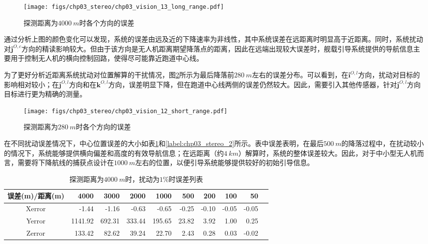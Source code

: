 \begin{figure}[htb]
\centering
\texttt{[image: figs/chp03\_stereo/chp03\_vision\_13\_long\_range.pdf]}	
\caption{探测距离为$4000\ m$时各个方向的误差}
\label{fig:chp03_vision_13_long_range}
\end{figure}
通过分析上图的颜色变化可以发现，系统的误差由远及近的下降速率为非线性，其中系统误差在远距离时明显高于近距离。同时，系统扰动对$\mathbf{j}^{O,c}$方向的精读影响较大。但由于该方向是无人机距离期望降落点的距离，因此在远端出现较大误差时，舰载引导系统提供的导航信息主要用于控制无人机的横向控制回路，使得尽可能靠近跑道中心线。

为了更好分析近距离系统扰动对位置解算的干扰情况，图\ref{fig:chp03_vision_12_short_range}所示为最后降落前$280\ m$左右的误差分布。可以看到，在$\mathbf{i}^{O,l}$方向，扰动对目标的影响相对较小；在$\mathbf{j}^{O,l}$方向和在$\mathbf{k}^{O,l}$方向，误差明显下降，但在跑道中心线两侧的误差仍然较大。因此，需要引入其他传感器，针对$\mathbf{j}^{O,l}$方向目标进行更为精确的测量。

\begin{figure}[htb]
	\centering
	\texttt{[image: figs/chp03\_stereo/chp03\_vision\_12\_short\_range.pdf]}	
	\caption{探测距离为$280\ m$时各个方向的误差}
	\label{fig:chp03_vision_12_short_range}
\end{figure}


在不同扰动误差情况下，中心位置误差的大小如表\ref{label:chp03_stereo_1}和\ref{label:chp03_stereo_2}所示。表中误差表明，在最后$500\ m$的降落过程中，在扰动较小的情况下，系统能够提供横向偏差和高度的有效导航信息；在远距离（约$4\ km$）解算时，系统的整体误差较大。因此，对于中小型无人机而言，需要将下降航线的捕获点设计在$1000\ m$左右的位置，以便引导系统能够提供较好的初始引导信息。
\begin{table}[htb]
	\centering
	\caption{探测距离为$4000\ m$时，扰动为$1\%$时误差列表}
	\label{label:chp03_stereo_1}
	\begin{tabular}{crrrrrrrrr}
		\hline
		误差(m)/距离(m)     & 4000    & 3000   & 2000     & 1000  & 500   & 200   & 100   & 50     \\ \hline
		Xerror  & -1.44   & -1.16  & -0.63  & -0.65   & -0.25 & -0.10 & -0.05 & -0.05\\ 
		Yerror  & 1141.92 & 692.31 & 333.44 & 195.65  & 23.82 & 3.92  & 1.00  & 0.25   \\
		Zerror  & 133.42  & 82.62  & 39.24  & 22.70   & 2.43  & 0.28  & 0.03  & -0.02  \\ \hline
		
	\end{tabular}
\end{table}


